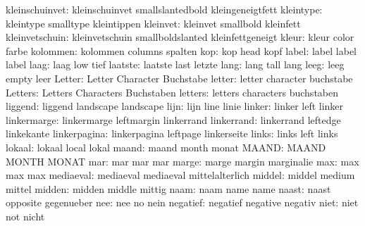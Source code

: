      kleinschuinvet:  kleinschuinvet       smallslantedbold    kleingeneigtfett
          kleintype:  kleintype            smalltype           kleintippen
           kleinvet:  kleinvet             smallbold           kleinfett
     kleinvetschuin:  kleinvetschuin       smallboldslanted    kleinfettgeneigt
              kleur:  kleur                color               farbe
           kolommen:  kolommen             columns             spalten
                kop:  kop                  head                kopf
              label:  label                label               label
               laag:  laag                 low                 tief
            laatste:  laatste              last                letzte
               lang:  lang                 tall                lang
               leeg:  leeg                 empty               leer
             Letter:  Letter               Character           Buchstabe
             letter:  letter               character           buchstabe
            Letters:  Letters              Characters          Buchstaben
            letters:  letters              characters          buchstaben
            liggend:  liggend              landscape           landscape %
               lijn:  lijn                 line                linie
             linker:  linker               left                linker
        linkermarge:  linkermarge          leftmargin          linkerrand
         linkerrand:  linkerrand           leftedge            linkekante
       linkerpagina:  linkerpagina         leftpage            linkerseite
              links:  links                left                links
             lokaal:  lokaal               local               lokal
              maand:  maand                month               monat
              MAAND:  MAAND                MONTH               MONAT
                mar:  mar                  mar                 mar
              marge:  marge                margin              marginalie
                max:  max                  max                 max
          mediaeval:  mediaeval            mediaeval           mittelalterlich
             middel:  middel               medium              mittel
             midden:  midden               middle              mittig
               naam:  naam                 name                name
              naast:  naast                opposite            gegenueber
                nee:  nee                  no                  nein
           negatief:  negatief             negative            negativ %
               niet:  niet                 not                 nicht
